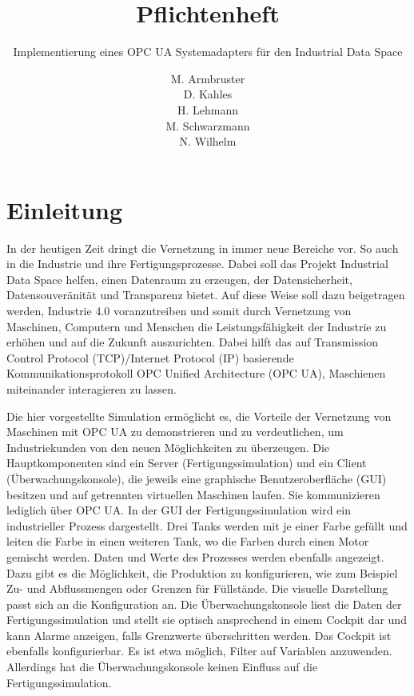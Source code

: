 \documentclass[parskip=full]{scrartcl}
\title{Pflichtenheft}
\subtitle{Implementierung eines OPC UA Systemadapters für den Industrial Data Space}
\author{
    M. Armbruster\\
    D. Kahles\\
    H. Lehmann\\
    M. Schwarzmann\\
    N. Wilhelm
}
\begin{document}
\maketitle
\tableofcontents
\pagebreak

\section{Einleitung}
In der heutigen Zeit dringt die Vernetzung in immer neue Bereiche vor. So auch in die Industrie und ihre Fertigungsprozesse.
Dabei soll das Projekt Industrial Data Space helfen, einen Datenraum zu erzeugen, der Datensicherheit, Datensouveränität und
Transparenz bietet. Auf diese Weise soll dazu beigetragen werden, Industrie 4.0 voranzutreiben und somit durch Vernetzung von 
Maschinen, Computern und Menschen die Leistungsfähigkeit der Industrie zu erhöhen und auf die Zukunft auszurichten.
Dabei hilft das auf Transmission Control Protocol (TCP)/Internet Protocol (IP) basierende Kommunikationsprotokoll OPC Unified Architecture (OPC UA), Maschienen miteinander interagieren zu lassen.

Die hier vorgestellte Simulation ermöglicht es, die Vorteile der Vernetzung von Maschinen mit OPC UA zu demonstrieren und zu verdeutlichen, um Industriekunden von den neuen Möglichkeiten zu überzeugen.
Die Hauptkomponenten sind ein Server (Fertigungssimulation) und ein Client (Überwachungskonsole),
die jeweils eine graphische Benutzeroberfläche (GUI) besitzen und auf getrennten virtuellen Maschinen laufen. 
Sie kommunizieren lediglich über OPC UA. 
In der GUI der Fertigungssimulation wird ein industrieller Prozess dargestellt.
Drei Tanks werden mit je einer Farbe gefüllt und leiten die Farbe in einen weiteren Tank, 
wo die Farben durch einen Motor gemischt werden. Daten und Werte des Prozesses werden ebenfalls angezeigt. Dazu gibt es 
die Möglichkeit, die Produktion zu konfigurieren, wie zum Beispiel Zu- und Abflussmengen oder Grenzen für Füllstände. 
Die visuelle Darstellung passt sich an die Konfiguration an.
Die Überwachungskonsole liest die Daten der Fertigungssimulation und stellt sie optisch ansprechend in einem Cockpit dar
und kann Alarme anzeigen, falls Grenzwerte überschritten werden. Das Cockpit ist ebenfalls konfigurierbar. Es ist etwa möglich, Filter auf Variablen anzuwenden. Allerdings hat die Überwachungskonsole keinen Einfluss auf die Fertigungssimulation.
      
\end{document}
